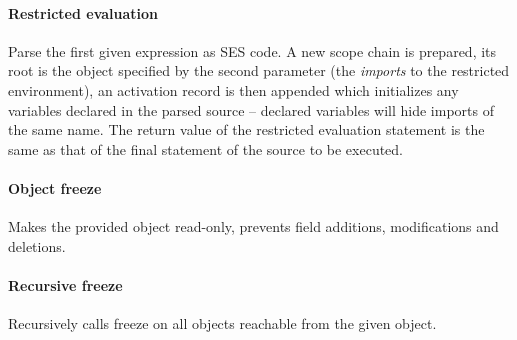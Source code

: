 \documentclass[a4paper]{article}
\begin{document}
\paragraph{Restricted evaluation} Parse the first given expression as SES code. A new
scope chain is prepared, its root is the object specified by the second
parameter (the \emph{imports} to the restricted environment), an activation
record is then appended which initializes any variables declared in the parsed
source -- declared variables will hide imports of the same name. The return
value of the restricted evaluation statement is the same as that of the final
statement of the source to be executed.

\paragraph{Object freeze} Makes the provided object read-only, prevents field additions,
modifications and deletions.

\paragraph{Recursive freeze} Recursively calls freeze on all objects reachable
from the given object.
\end{document}
